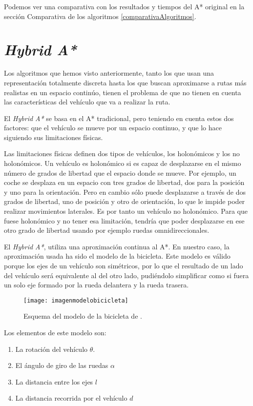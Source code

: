 Podemos ver una comparativa con los resultados y tiempos del A* original en la sección Comparativa de los algoritmos \ref{comparativaAlgoritmos}.

\section{\textit{Hybrid A*}}
Los algoritmos que hemos visto anteriormente, tanto los que usan una representación totalmente discreta hasta los que buscan aproximarse a rutas más realistas en un espacio continúo, tienen el problema de que no tienen en cuenta las características del vehículo que va a realizar la ruta.

El \textit{Hybrid A*}\cite{dolgov08gppISER,dolgov08gppSTAIR} se basa en el A* tradicional, pero teniendo en cuenta estos dos factores: que el vehículo se mueve por un espacio continuo, y que lo hace siguiendo sus limitaciones físicas.

Las limitaciones físicas definen dos tipos de vehículos, los holonómicos y los no holonómicos. Un vehículo es holonómico si es capaz de desplazarse en el mismo número de grados de libertad que el espacio donde se mueve. Por ejemplo, un coche se desplaza en un espacio con tres grados de libertad, dos para la posición y uno para la orientación. Pero en cambio sólo puede desplazarse a través de dos grados de libertad, uno de posición y otro de orientación, lo que le impide poder realizar movimientos laterales. Es por tanto un vehículo no holonómico. Para que fuese holonómico y no tener esa limitación, tendría que poder desplazarse en ese otro grado de libertad usando por ejemplo ruedas omnidireccionales.

El \textit{Hybrid A*}, utiliza una aproximación continua al A*. En nuestro caso, la aproximación usada ha sido el modelo de la bicicleta. Este modelo es válido porque los ejes de un vehículo son simétricos, por lo que el resultado de un lado del vehículo será equivalente al del otro lado, pudiéndolo simplificar como si fuera un solo eje formado por la rueda delantera y la rueda trasera.
\begin{figure}[htpb]
    \centering
    \texttt{[image: imagenmodelobicicleta]}
    \caption[Esquema del modelo de la bicicleta]{Esquema del modelo de la bicicleta de \cite{articuloimagenmodelobicicleta}.}
    \label{fig:basics AFM sketch}
\end{figure}

Los elementos de este modelo son:
\begin{enumerate}
\item La rotación del vehículo $\theta$.
\item El ángulo de giro de las ruedas $\alpha$
\item La distancia entre los ejes $l$
\item La distancia recorrida por el vehículo $d$
\end{enumerate}

